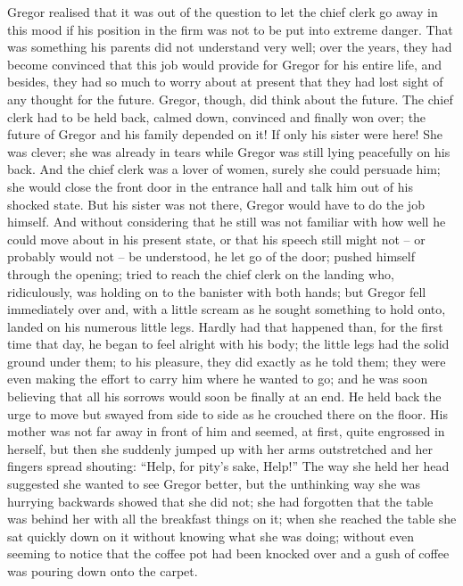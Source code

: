 Gregor realised that it was out of the question to let the chief clerk
go away in this mood if his position in the firm was not to be put into
extreme danger. That was something his parents did not understand very
well; over the years, they had become convinced that this job would
provide for Gregor for his entire life, and besides, they had so much
to worry about at present that they had lost sight of any thought for
the future. Gregor, though, did think about the future. The chief clerk
had to be held back, calmed down, convinced and finally won over; the
future of Gregor and his family depended on it! If only his sister were
here! She was clever; she was already in tears while Gregor was still
lying peacefully on his back. And the chief clerk was a lover of women,
surely she could persuade him; she would close the front door in the
entrance hall and talk him out of his shocked state. But his sister was
not there, Gregor would have to do the job himself. And without
considering that he still was not familiar with how well he could move
about in his present state, or that his speech still might not – or
probably would not – be understood, he let go of the door; pushed himself
through the opening; tried to reach the chief clerk on the landing who,
ridiculously, was holding on to the banister with both hands; but
Gregor fell immediately over and, with a little scream as he sought
something to hold onto, landed on his numerous little legs. Hardly had
that happened than, for the first time that day, he began to feel
alright with his body; the little legs had the solid ground under them;
to his pleasure, they did exactly as he told them; they were even
making the effort to carry him where he wanted to go; and he was soon
believing that all his sorrows would soon be finally at an end. He held
back the urge to move but swayed from side to side as he crouched there
on the floor. His mother was not far away in front of him and seemed,
at first, quite engrossed in herself, but then she suddenly jumped up
with her arms outstretched and her fingers spread shouting: “Help, for
pity’s sake, Help!” The way she held her head suggested she wanted to
see Gregor better, but the unthinking way she was hurrying backwards
showed that she did not; she had forgotten that the table was behind
her with all the breakfast things on it; when she reached the table she
sat quickly down on it without knowing what she was doing; without even
seeming to notice that the coffee pot had been knocked over and a gush
of coffee was pouring down onto the carpet.


